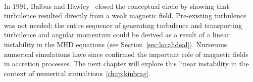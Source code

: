 \\
In 1991, Balbus and Hawley~\cite{BH1991a,BH1991b,BH1991c} closed the conceptual circle by showing that turbulence resulted directly from a weak magnetic field. Pre-existing turbulence was not needed; the entire sequence of generating turbulence and transporting turbulence and angular momentum could be derived as a result of a linear instability in the MHD equations (see Section~\ref{sec:localideal}). Numerous numerical simulations have since confirmed the important role of magnetic fields in accretion processes. The next chapter will explore this linear instability in the context of numerical simualtions~\ref{chap:kinbrag}.
